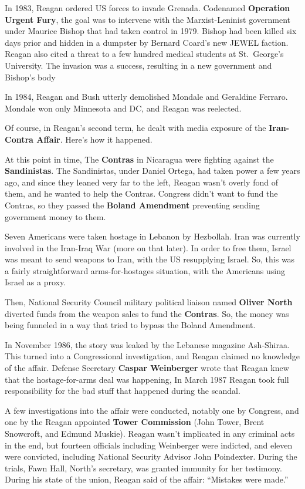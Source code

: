 In 1983, Reagan ordered US forces to invade Grenada.
Codenamed \textbf{Operation Urgent Fury},
the goal was to intervene with the Marxist-Leninist government under Maurice Bishop that had taken control in 1979.
Bishop had been killed six days prior and hidden in a dumpster by Bernard Coard's new JEWEL faction.
Reagan also cited a threat to a few hundred medical students at St.\ George's University.
The invasion was a success, resulting in a new government and Bishop's body

In 1984, Reagan and Bush utterly demolished Mondale and Geraldine Ferraro.
Mondale won only Minnesota and DC, and Reagan was reelected.

Of course, in Reagan's second term, he dealt with media exposure of the \textbf{Iran-Contra Affair}.
Here's how it happened.

At this point in time, The \textbf{Contras} in Nicaragua were fighting against the \textbf{Sandinistas}.
The Sandinistas, under Daniel Ortega, had taken power a few years ago,
and since they leaned very far to the left,
Reagan wasn't overly fond of them, and he wanted to help the Contras.
Congress didn't want to fund the Contras,
so they passed the \textbf{Boland Amendment} preventing sending government money to them.

Seven Americans were taken hostage in Lebanon by Hezbollah.
Iran was currently involved in the Iran-Iraq War (more on that later).
In order to free them, Israel was meant to send weapons to Iran, with the US resupplying Israel.
So, this was a fairly straightforward arms-for-hostages situation, with the Americans using Israel as a proxy.

Then, National Security Council military political liaison named \textbf{Oliver North}
diverted funds from the weapon sales to fund the \textbf{Contras}.
So, the money was being funneled in a way that tried to bypass the Boland Amendment.

In November 1986, the story was leaked by the Lebanese magazine Ash-Shiraa.
This turned into a Congressional investigation, and Reagan claimed no knowledge of the affair.
Defense Secretary \textbf{Caspar Weinberger} wrote that Reagan knew that the hostage-for-arms deal was happening,
In March 1987 Reagan took full responsibility for the bad stuff that happened during the scandal.

A few investigations into the affair were conducted, notably one by Congress,
and one by the Reagan appointed \textbf{Tower Commission} (John Tower, Brent Snowcroft, and Edmund Muskie).
Reagan wasn't implicated in any criminal acts in the end,
but fourteen officials including Weinberger were indicted, and eleven were convicted,
including National Security Advisor John Poindexter.
During the trials, Fawn Hall, North's secretary, was granted immunity for her testimony.
During his state of the union, Reagan said of the affair: ``Mistakes were made.''

